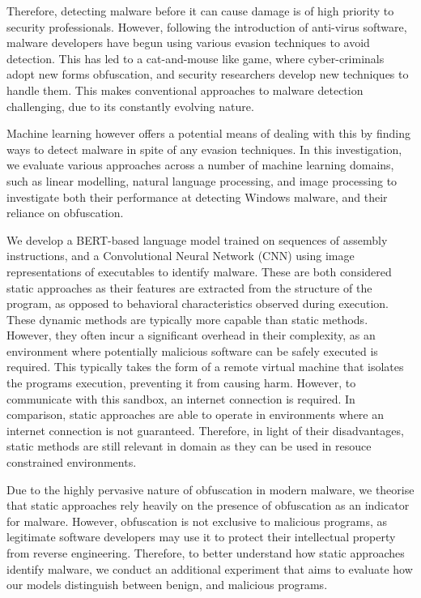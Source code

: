 \documentclass[conference,compsoc]{IEEEtran}
\begin{document}
Therefore, detecting malware before it can cause damage is of high priority to security professionals. However, following the introduction of anti-virus software, malware developers have begun using various evasion techniques to avoid detection. This has led to a cat-and-mouse like game, where cyber-criminals adopt new forms obfuscation, and security researchers develop new techniques to handle them. This makes conventional approaches to malware detection challenging, due to its constantly evolving nature. 

Machine learning however offers a potential means of dealing with this by finding ways to detect malware in spite of any evasion techniques. In this investigation, we evaluate various approaches across a number of machine learning domains, such as linear modelling, natural language processing, and image processing to investigate both their performance at detecting Windows malware, and their reliance on obfuscation. 

We develop a BERT-based language model trained on sequences of assembly instructions, and a Convolutional Neural Network (CNN) using image representations of executables to identify malware. These are both considered static approaches as their features are extracted from the structure of the program, as opposed to behavioral characteristics observed during execution. These dynamic methods are typically more capable than static methods. However, they often incur a significant overhead in their complexity, as an environment where potentially malicious software can be safely executed is required. This typically takes the form of a remote virtual machine that isolates the programs execution, preventing it from causing harm. However, to communicate with this sandbox, an internet connection is required. In comparison, static approaches are able to operate in environments where an internet connection is not guaranteed. Therefore, in light of their disadvantages, static methods are still relevant in domain as they can be used in resouce constrained environments. 

Due to the highly pervasive nature of obfuscation in modern malware, we theorise that static approaches rely heavily on the presence of obfuscation as an indicator for malware. However, obfuscation is not exclusive to malicious programs, as legitimate software developers may use it to protect their intellectual property from reverse engineering. Therefore, to better understand how static approaches identify malware, we conduct an additional experiment that aims to evaluate how our models distinguish between benign, and malicious programs. 
\end{document}
